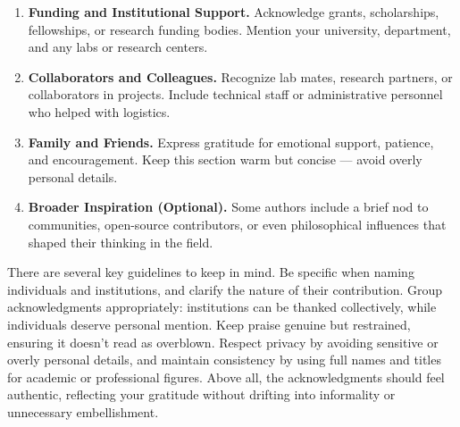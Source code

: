 \documentclass[PCOM,Thesis,Review]{mpThesis}
\newcommand{\Hd}[1]{{\color{SteelBlue}\bf#1.}}
\begin{document}
\begin{FrontMatter}[FigLs=true,TabLs=true,AlgoLs=false,AbbreLs=true]
\begin{Remark}
\begin{enumerate}
\item \Hd{Funding and Institutional Support}
Acknowledge grants, scholarships, fellowships, or research funding bodies. Mention your university, department, and any labs or research centers.

\item \Hd{Collaborators and Colleagues}
Recognize lab mates, research partners, or collaborators in projects. Include technical staff or administrative personnel who helped with logistics.

\item \Hd{Family and Friends}
Express gratitude for emotional support, patience, and encouragement. Keep this section warm but concise --- avoid overly personal details.

\item \Hd{Broader Inspiration (Optional)}
Some authors include a brief nod to communities, open-source contributors, or even philosophical influences that shaped their thinking in the field.
\end{enumerate}

There are several key guidelines to keep in mind.
Be specific when naming individuals and institutions, and clarify the nature of their contribution.
Group acknowledgments appropriately: institutions can be thanked collectively, while individuals deserve personal mention.
Keep praise genuine but restrained, ensuring it doesn't read as overblown.
Respect privacy by avoiding sensitive or overly personal details, and maintain consistency by using full names and titles for academic or professional figures.
Above all, the acknowledgments should feel authentic, reflecting your gratitude without drifting into informality or unnecessary embellishment.
\end{Remark}

\end{FrontMatter}
\end{document}
